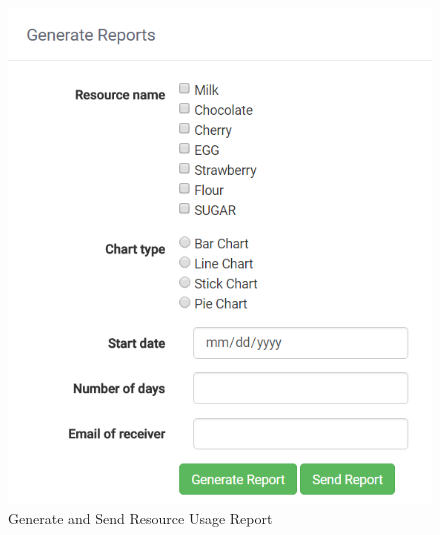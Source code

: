 \documentclass[a4paper,11pt,twoside]{report}
\theoremstyle{definition}
\begin{document}
\begin{enumerate}
\begin{figure}[h!]
\begin{center}
\includegraphics[scale = 1]{AS/report/3}
\end{center}
\caption{Generate and Send Resource Usage Report}
\end{figure}
\thispagestyle{empty}


\end{enumerate}
\end{document}
